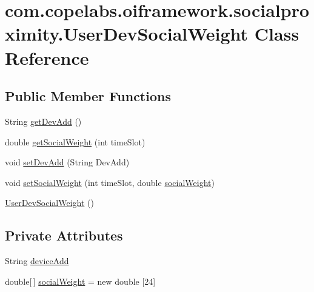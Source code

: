 \hypertarget{classcom_1_1copelabs_1_1oiframework_1_1socialproximity_1_1_user_dev_social_weight}{}\section{com.\+copelabs.\+oiframework.\+socialproximity.\+User\+Dev\+Social\+Weight Class Reference}
\label{classcom_1_1copelabs_1_1oiframework_1_1socialproximity_1_1_user_dev_social_weight}
\subsection*{Public Member Functions}
\begin{DoxyCompactItemize}
\item 
String \hyperlink{classcom_1_1copelabs_1_1oiframework_1_1socialproximity_1_1_user_dev_social_weight_a630b81706927766c0b87735b5495233a}{get\+Dev\+Add} ()
\item 
double \hyperlink{classcom_1_1copelabs_1_1oiframework_1_1socialproximity_1_1_user_dev_social_weight_a8dc6b6435dc7a9db915c2adeaa20edbf}{get\+Social\+Weight} (int time\+Slot)
\item 
void \hyperlink{classcom_1_1copelabs_1_1oiframework_1_1socialproximity_1_1_user_dev_social_weight_adb54473a86d98ee2adb8fe98387b720f}{set\+Dev\+Add} (String Dev\+Add)
\item 
void \hyperlink{classcom_1_1copelabs_1_1oiframework_1_1socialproximity_1_1_user_dev_social_weight_ad542ff7e558b7d9073b6afd93109858f}{set\+Social\+Weight} (int time\+Slot, double \hyperlink{classcom_1_1copelabs_1_1oiframework_1_1socialproximity_1_1_user_dev_social_weight_a95cef9dcbf307bd6601c2e6baa47948e}{social\+Weight})
\item 
\hyperlink{classcom_1_1copelabs_1_1oiframework_1_1socialproximity_1_1_user_dev_social_weight_a1cd5fa4930281ba75f3ee94360ce796f}{User\+Dev\+Social\+Weight} ()
\end{DoxyCompactItemize}
\subsection*{Private Attributes}
\begin{DoxyCompactItemize}
\item 
String \hyperlink{classcom_1_1copelabs_1_1oiframework_1_1socialproximity_1_1_user_dev_social_weight_abacf5f84c5a33c950e0215e1d56b2b8a}{device\+Add}
\item 
double\mbox{[}$\,$\mbox{]} \hyperlink{classcom_1_1copelabs_1_1oiframework_1_1socialproximity_1_1_user_dev_social_weight_a95cef9dcbf307bd6601c2e6baa47948e}{social\+Weight} = new double \mbox{[}24\mbox{]}
\end{DoxyCompactItemize}


